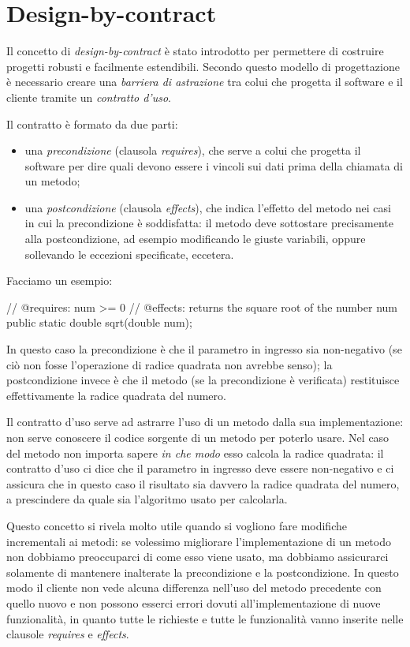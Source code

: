\section{Design-by-contract}
Il concetto di \emph{design-by-contract} è stato introdotto per permettere di costruire progetti robusti e facilmente estendibili. Secondo questo modello di progettazione è necessario creare una \emph{barriera di astrazione} tra colui che progetta il software e il cliente tramite un \emph{contratto d'uso}.

Il contratto è formato da due parti:
\begin{itemize}
    \item una \emph{precondizione} (clausola \emph{requires}), che serve a colui che progetta il software per dire quali devono essere i vincoli sui dati prima della chiamata di un metodo;
    \item una \emph{postcondizione} (clausola \emph{effects}), che indica l'effetto del metodo nei casi in cui la precondizione è soddisfatta: il metodo deve sottostare precisamente alla postcondizione, ad esempio modificando le giuste variabili, oppure sollevando le eccezioni specificate, eccetera.
\end{itemize}

Facciamo un esempio:
\begin{Java}
    // @requires: num >= 0
    // @effects: returns the square root of the number num
    public static double sqrt(double num);
\end{Java}
In questo caso la precondizione è che il parametro in ingresso  sia non-negativo (se ciò non fosse l'operazione di radice quadrata non avrebbe senso); la postcondizione invece è che il metodo (se la precondizione è verificata) restituisce effettivamente la radice quadrata del numero.

Il contratto d'uso serve ad astrarre l'uso di un metodo dalla sua implementazione: non serve conoscere il codice sorgente di un metodo per poterlo usare. Nel caso del metodo  non importa sapere \emph{in che modo} esso calcola la radice quadrata: il contratto d'uso ci dice che il parametro in ingresso deve essere non-negativo e ci assicura che in questo caso il risultato sia davvero la radice quadrata del numero, a prescindere da quale sia l'algoritmo usato per calcolarla.

Questo concetto si rivela molto utile quando si vogliono fare modifiche incrementali ai metodi: se volessimo migliorare l'implementazione di un metodo non dobbiamo preoccuparci di come esso viene usato, ma dobbiamo assicurarci solamente di mantenere inalterate la precondizione e la postcondizione. In questo modo il cliente non vede alcuna differenza nell'uso del metodo precedente con quello nuovo e non possono esserci errori dovuti all'implementazione di nuove funzionalità, in quanto tutte le richieste e tutte le funzionalità vanno inserite nelle clausole \emph{requires} e \emph{effects}.

